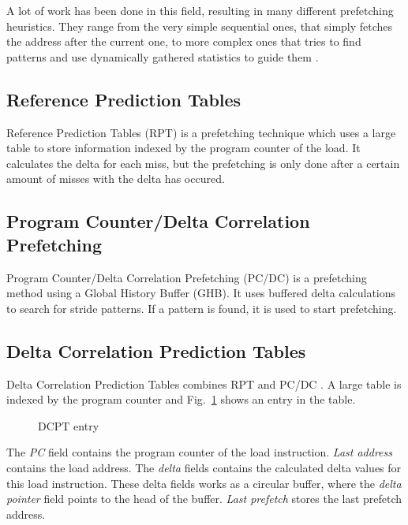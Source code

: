 A lot of work has been done in this field, resulting in many different prefetching heuristics. They
range from the very simple sequential ones, that simply fetches the address after the current one,
to more complex ones that tries to find patterns and use dynamically gathered statistics to guide
them \cite{prefetch_range}.

\subsection{Reference Prediction Tables}
Reference Prediction Tables (RPT) \cite{rpt} is a prefetching technique which uses a large table to store
information indexed by the program counter of the load. It calculates the delta for each miss, but
the prefetching is only done after a certain amount of misses with the delta has occured.

\subsection{Program Counter/Delta Correlation Prefetching}
Program Counter/Delta Correlation Prefetching (PC/DC) \cite{prefetch_range} is a prefetching method using a Global History
Buffer (GHB). It uses buffered delta calculations to search for stride patterns. If a pattern is
found, it is used to start prefetching.

\subsection{Delta Correlation Prediction Tables} 
Delta Correlation Prediction Tables combines RPT and PC/DC \cite{dcpt}. A large table is indexed by
the program counter and Fig.~\ref{fig:dcpt_entry} shows an entry in the table.
\begin{figure}[h]
	\begin{center}
	\end{center}
	\caption{DCPT entry\label{fig:dcpt_entry}}
\end{figure}
The \emph{PC} field contains the program counter of the load instruction. \emph{Last address} contains the load
address. The \emph{delta} fields contains the calculated delta values for this load instruction. These
delta fields works as a circular buffer, where the \emph{delta pointer} field points to the head of the
buffer. \emph{Last prefetch} stores the last prefetch address. 


